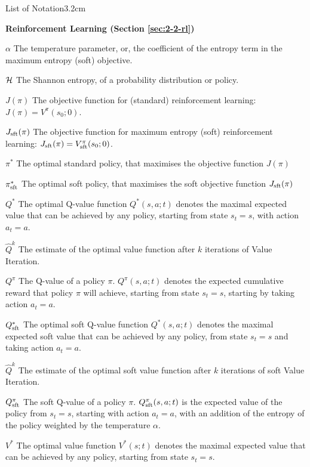 \begin{mclistof}{List of Notation}{3.2cm}
    \item[\Large\textbf{Reinforcement Learning (Section \ref{sec:2-2-rl})}\hfill\hfill]
    \item[$\alpha$] 
        The temperature parameter, or, the coefficient of the entropy term in the maximum entropy (soft) objective.
    \item[$\mathcal{H}$]
        The Shannon entropy, of a probability distribution or policy.
    \item[$J(\pi)$] 
        The objective function for (standard) reinforcement learning: $J(\pi) = V^{\pi}(s_0;0)$.
    \item[$J_{{\textnormal{sft}}}(\pi)$] 
        The objective function for maximum entropy (soft) reinforcement learning: $J_{{\textnormal{sft}}}(\pi) = V_{{\textnormal{sft}}}^{\pi}(s_0;0)$.
    \item[$\pi^*$]
        The optimal standard policy, that maximises the objective function $J(\pi)$
    \item[$\pi_{{\textnormal{sft}}}^*$]
        The optimal soft policy, that maximises the soft objective function $J_{{\textnormal{sft}}}(\pi)$
    \item[$Q^*$]
        The optimal Q-value function $Q^*(s,a;t)$ denotes the maximal expected value that can be achieved by any policy, starting from state $s_t=s$, with action $a_t=a$.
    \item[$\hat{Q}^k$]
        The estimate of the optimal value function after $k$ iterations of Value Iteration.
    \item[$Q^{\pi}$]
        The Q-value of a policy $\pi$. $Q^{\pi}(s,a;t)$ denotes the expected cumulative reward that policy $\pi$ will achieve, starting from state $s_t=s$, starting by taking action $a_t=a$.
    \item[$Q_{{\textnormal{sft}}}^*$]
        The optimal soft Q-value function $Q^*(s,a;t)$ denotes the maximal expected soft value that can be achieved by any policy, from state $s_t=s$ and taking action $a_t=a$. 
    \item[$\hat{Q}^k$]
        The estimate of the optimal soft value function after $k$ iterations of soft Value Iteration.
    \item[$Q_{{\textnormal{sft}}}^{\pi}$]
        The soft Q-value of a policy $\pi$. $Q_{{\textnormal{sft}}}^{\pi}(s,a;t)$ is the expected value of the policy from $s_t=s$, starting with action $a_t=a$, with an addition of the entropy of the policy weighted by the temperature $\alpha$.
    \item[$V^*$]
        The optimal value function $V^*(s;t)$ denotes the maximal expected value that can be achieved by any policy, starting from state $s_t=s$.

\end{mclistof}
